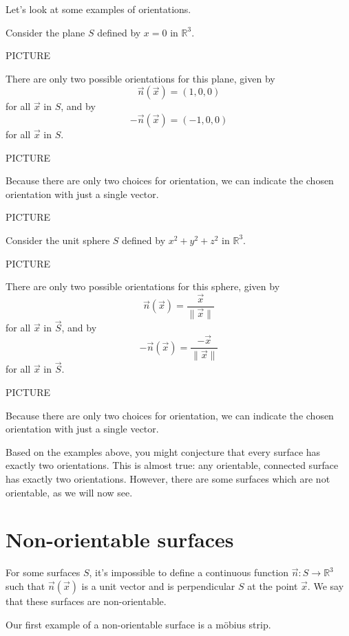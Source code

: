 \documentclass{ximera}
\begin{document}
Let's look at some examples of orientations.

\begin{example}
Consider the plane $S$ defined by $x=0$ in $\mathbb{R}^3$.

PICTURE

There are only two possible orientations for this plane, given by
\[
\vec{n}(\vec{x}) = (1,0,0)
\]
for all $\vec{x}$ in $S$, and by
\[
-\vec{n}(\vec{x}) = (-1,0,0)
\]
for all $\vec{x}$ in $S$.

PICTURE

Because there are only two choices for orientation, we can indicate the chosen orientation with just a single vector.

PICTURE
\end{example}

\begin{example}
Consider the unit sphere $S$ defined by $x^2+y^2+z^2$ in $\mathbb{R}^3$.

PICTURE

There are only two possible orientations for this sphere, given by
\[
\vec{n}(\vec{x}) = \frac{\vec{x}}{\|\vec{x}\|}
\]
for all $\vec{x}$ in $\vec{S}$, and by
\[
-\vec{n}(\vec{x}) = \frac{-\vec{x}}{\|\vec{x}\|}
\]
for all $\vec{x}$ in $\vec{S}$.

PICTURE

Because there are only two choices for orientation, we can indicate the chosen orientation with just a single vector.
\end{example}

Based on the examples above, you might conjecture that every surface has exactly two orientations. This is almost true: any orientable, connected surface has exactly two orientations. However, there are some surfaces which are not orientable, as we will now see.

\section*{Non-orientable surfaces}

For some surfaces $S$, it's impossible to define a continuous function $\vec{n}:S\rightarrow\mathbb{R}^3$ such that $\vec{n}(\vec{x})$ is a unit vector and is perpendicular $S$ at the point $\vec{x}$. We say that these surfaces are non-orientable.

Our first example of a non-orientable surface is a m\"{o}bius strip.
\end{document}
